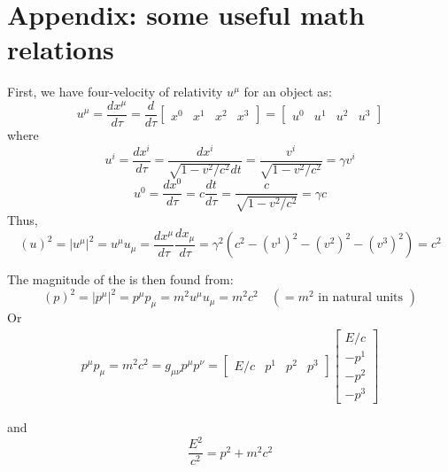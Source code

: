 \section{Appendix: some useful math relations}
First, we have four-velocity of relativity $u^{\mu}$ for an object as:
\begin{equation}
u^{\mu}=\frac{d x^{\mu}}{d \tau}=\frac{d}{d \tau}\left[\begin{array}{cccc}
{x^{0}} & {x^{1}} & {x^{2}} & {x^{3}}
\end{array}\right]=\left[\begin{array}{cccc}
{u^{0}} & {u^{1}} & {u^{2}} & {u^{3}}
\end{array}\right]
\end{equation}
where
\begin{equation}
u^{i}=\frac{d x^{i}}{d \tau}=\frac{d x^{i}}{\sqrt{1-v^{2} / c^{2}} d t}=\frac{v^{i}}{\sqrt{1-v^{2} / c^{2}}}=\gamma v^{i}
\end{equation}
\begin{equation}
u^{0}=\frac{d x^{0}}{d \tau}=c \frac{d t}{d \tau}=\frac{c}{\sqrt{1-v^{2} / c^{2}}}=\gamma c
\end{equation}
Thus,
\begin{equation}
(u)^{2}=\left|u^{\mu}\right|^{2}=u^{\mu} u_{\mu}=\frac{d x^{\mu}}{d \tau} \frac{d x_{\mu}}{d \tau}=\gamma^{2}\left(c^{2}-\left(v^{1}\right)^{2}-\left(v^{2}\right)^{2}-\left(v^{3}\right)^{2}\right)=c^{2}
\end{equation}

The magnitude of the  is  then found from:
\begin{equation}
(p)^{2}=\left|p^{\mu}\right|^{2}=p^{\mu} p_{\mu}=m^{2} u^{\mu} u_{\mu}=m^{2} c^{2} \quad\left(=m^{2} \text { in natural units }\right)
\end{equation}
 Or
\begin{equation}
    \begin{array}{l}
{p^{\mu} p_{\mu}=m^{2} c^{2}=g_{\mu \nu} p^{\mu} p^{\nu}=\left[\begin{array}{cccc}
{E / c} & {p^{1}} & {p^{2}} & {p^{3}}
\end{array}\right]\left[\begin{array}{c}
{E / c} \\
{-p^{1}} \\
{-p^{2}} \\
{-p^{3}}
\end{array}\right]}
\end{array}
\end{equation}

and
\begin{equation}
\frac{E^{2}}{c^{2}}=p^{2}+m^{2} c^{2}
\end{equation}